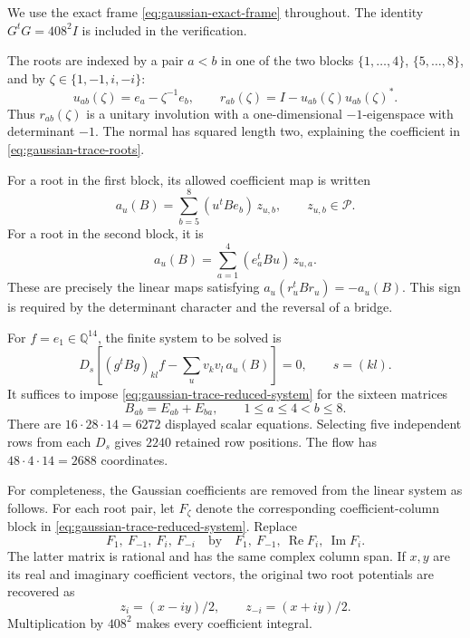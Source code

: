 \documentclass[11pt]{article}
\theoremstyle{definition}
\theoremstyle{remark}
\begin{document}
We use the exact frame \eqref{eq:gaussian-exact-frame} throughout.
The identity \(G^tG=408^2I\) is included in the verification.

The roots are indexed by a pair \(a<b\) in one of the two blocks
\(\{1,\ldots,4\}\), \(\{5,\ldots,8\}\), and by
\(\zeta\in\{1,-1,i,-i\}\):
\begin{equation}
 u_{ab}(\zeta)=e_a-\zeta^{-1}e_b,\qquad
 r_{ab}(\zeta)=I-u_{ab}(\zeta)u_{ab}(\zeta)^*.
 \label{eq:gaussian-trace-roots}
\end{equation}
Thus \(r_{ab}(\zeta)\) is a unitary involution with a one-dimensional $-1$-eigenspace with determinant
\(-1\).  The normal has squared length two, explaining the coefficient
in \eqref{eq:gaussian-trace-roots}.

For a root in the first block, its allowed coefficient map is written
\begin{equation}
 a_u(B)=\sum_{b=5}^{8}(u^tBe_b)\,z_{u,b},
 \qquad z_{u,b}\in\mathcal P.
 \label{eq:gaussian-trace-potential-u}
\end{equation}
For a root in the second block, it is
\begin{equation}
 a_u(B)=\sum_{a=1}^{4}(e_a^tBu)\,z_{u,a}.
 \label{eq:gaussian-trace-potential-v}
\end{equation}
These are precisely the linear maps satisfying
\(a_u(r_u^tBr_u)=-a_u(B)\).  This sign is required by the determinant
character and the reversal of a bridge.

For \(f=e_1\in\mathbb Q^{14}\), the finite system to be solved is
\begin{equation}
 D_s\left[
    (g^tBg)_{kl}f-
    \sum_u v_kv_l\,a_u(B)
 \right]=0,
 \qquad s=(kl).
 \label{eq:gaussian-trace-reduced-system}
\end{equation}
It suffices to impose \eqref{eq:gaussian-trace-reduced-system} for the sixteen matrices
\[
 B_{ab}=E_{ab}+E_{ba},\qquad
 1\le a\le4< b\le8.
\]
There are \(16\cdot28\cdot14=6272\) displayed scalar equations.
Selecting five independent rows from each \(D_s\) gives \(2240\)
retained row positions.  The flow has
\(48\cdot4\cdot14=2688\) coordinates.

For completeness, the Gaussian coefficients are removed from the
linear system as follows.  For each root pair, let \(F_\zeta\) denote
the corresponding coefficient-column block in \eqref{eq:gaussian-trace-reduced-system}.  Replace
\[
 F_1,\ F_{-1},\ F_i,\ F_{-i}
 \quad\text{by}\quad
 F_1,\ F_{-1},\ \operatorname{Re}F_i,\ \operatorname{Im}F_i.
\]
The latter matrix is rational and has the same complex column span.
If \(x,y\) are its real and imaginary coefficient vectors, the
original two root potentials are recovered as
\begin{equation}
 z_i=(x-iy)/2,\qquad z_{-i}=(x+iy)/2.
 \label{eq:gaussian-trace-real-imag}
\end{equation}
Multiplication by \(408^2\) makes every coefficient integral.
\end{document}
